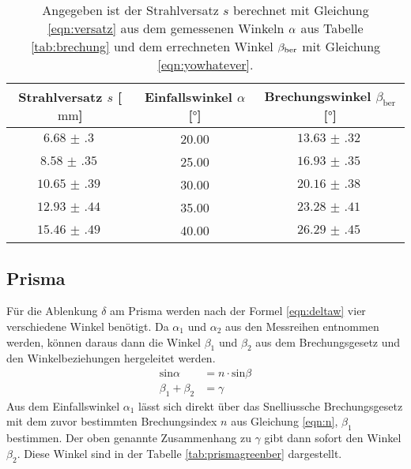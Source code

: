 \begin{table}
    \centering
    \caption{Angegeben ist der Strahlversatz $s$ berechnet mit Gleichung \eqref{eqn:versatz} aus dem gemessenen Winkeln $\protect \alpha$ aus Tabelle \ref{tab:brechung} und dem errechneten Winkel $\protect \beta_{\text{ber}}$ mit Gleichung \ref{eqn:yowhatever}.}
    \label{tab:wrtfffffffffffffffffffffffffffffff}
    \begin{tabular}{c | c c }
        \toprule
        Strahlversatz $s$ [$\si{\milli\meter}$]  & Einfallswinkel $\alpha$ [$\si{\degree}$] & Brechungswinkel $\beta_{\text{ber}}$ [$\si{\degree}$] \\
        \midrule
        $\SI{6.68(30)}{}$  & 20.00 & $\SI{13.63(32)}{}$\\
        $\SI{8.58(35)}{}$  & 25.00 & $\SI{16.93(35)}{}$\\
        $\SI{10.65(39)}{}$ & 30.00 & $\SI{20.16(38)}{}$\\
        $\SI{12.93(44)}{}$ & 35.00 & $\SI{23.28(41)}{}$\\
        $\SI{15.46(49)}{}$ & 40.00 & $\SI{26.29(45)}{}$\\
        \bottomrule    
    \end{tabular}
\end{table}
\subsection{Prisma}
Für die Ablenkung $\delta$ am Prisma werden nach der Formel \eqref{eqn:deltaw} vier verschiedene Winkel benötigt. 
Da $\alpha_1$ und $\alpha_2$  aus den Messreihen entnommen werden, können daraus dann die Winkel $\beta_1$ und $\beta_2$ aus dem Brechungsgesetz und den Winkelbeziehungen hergeleitet werden.
\begin{align}
    \label{eqn:11}
    \text{sin}\alpha &= n \cdot \text{sin}\beta \\
    \label{eqn:12}
    \beta_1 + \beta_2 &= \gamma
\end{align}
Aus dem Einfallswinkel $\alpha_1$ lässt sich direkt über das Snelliussche Brechungsgesetz mit dem zuvor bestimmten Brechungsindex $n$ aus Gleichung \eqref{eqn:n}, $\beta_1$ bestimmen.
Der oben genannte Zusammenhang zu $\gamma$ gibt dann sofort den Winkel $\beta_2$. Diese Winkel sind in der Tabelle \ref{tab:prismagreenber} dargestellt.

